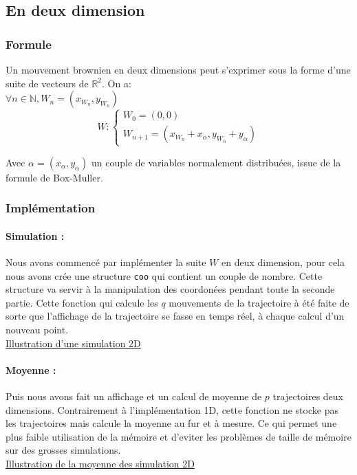 \documentclass[10pt,a4paper]{article}
\begin{document}
\subsection{En deux dimension}

\subsubsection{Formule}
Un mouvement brownien en deux dimensions peut s'exprimer sous la forme d'une suite de vecteurs de $\mathbb{R}^{2}$.
On a:\newline\\
$\forall n \in \mathbb{N}, W_n = (x_{W_n}, y_{W_n})$\newline
$$
W : \left\{\begin{array}{ll}
        W_0 = (0, 0)\\
        W_{n+1} = (x_{W_n} + x_{\alpha}, y_{W_n} + y_{\alpha})
    \end{array}
    \right.
$$

Avec $\alpha = (x_{\alpha}, y_{\alpha})$ un couple de variables normalement distribuées, issue de la formule de Box-Muller.
\subsubsection{Implémentation}

\paragraph{Simulation : }

Nous avons commencé par implémenter la suite $W$ en deux dimension, pour cela nous avons crée une structure \texttt{coo} 
qui contient un couple de nombre. Cette structure va servir à la manipulation des coordonées pendant toute la seconde partie.
Cette fonction qui calcule les $q$ mouvements de la trajectoire à été faite de sorte que l'affichage
de la trajectoire se fasse en temps réel, à chaque calcul d'un nouveau point. 
\\
\hyperref[figure3]{Illustration d'une simulation 2D}
\\

\paragraph{Moyenne : }

Puis nous avons fait un affichage et un calcul de moyenne de $p$ trajectoires deux dimensions.
Contrairement à l'implémentation 1D, cette fonction ne stocke pas les trajectoires mais calcule la moyenne au fur et à mesure.
Ce qui permet une plus faible utilisation de la mémoire et d'eviter les problèmes de taille de mémoire sur des grosses simulations.
\\
\hyperref[figure4]{Illustration de la moyenne des simulation 2D}
\\
\end{document}
